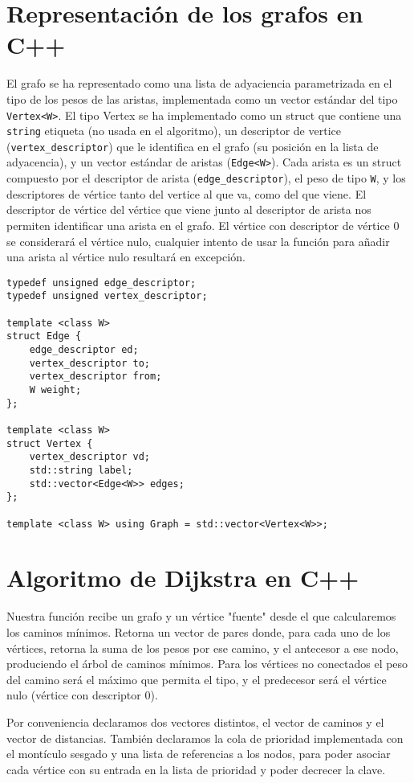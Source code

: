 \documentclass{article}
\begin{document}
\section{Representación de los grafos en C++}
El grafo se ha representado como una lista de adyaciencia parametrizada
en el tipo de los pesos de las aristas, implementada como un vector estándar del 
tipo \texttt{Vertex<W>}. El tipo Vertex se ha implementado como un struct que
contiene una \texttt{string} etiqueta (no usada en el algoritmo), un descriptor de
vertice (\texttt{vertex\_descriptor}) que le identifica en el grafo (su posición en
la lista de adyacencia), y un vector estándar de aristas (\texttt{Edge<W>}). Cada arista es un struct compuesto por el descriptor de arista (\texttt{edge\_descriptor}), el peso de tipo \texttt{W}, y los descriptores de vértice tanto del vertice al que va, como del que viene. El descriptor de vértice del vértice que viene junto al descriptor de arista nos permiten identificar una arista en el grafo. El vértice con descriptor de vértice 0 se considerará el vértice nulo, cualquier intento de usar la función para añadir una arista al vértice nulo resultará en excepción.
\begin{verbatim}
typedef unsigned edge_descriptor;
typedef unsigned vertex_descriptor;

template <class W> 
struct Edge {
    edge_descriptor ed;
    vertex_descriptor to;
    vertex_descriptor from;
    W weight;
};

template <class W>
struct Vertex {
    vertex_descriptor vd;
    std::string label;
    std::vector<Edge<W>> edges;
};

template <class W> using Graph = std::vector<Vertex<W>>;
\end{verbatim}

\section{Algoritmo de Dijkstra en C++}
Nuestra función recibe un grafo y un vértice "fuente" desde el que calcularemos los caminos mínimos. Retorna un vector de pares donde, para cada uno de los vértices, retorna la suma de los pesos por ese camino, y el antecesor a ese nodo, produciendo el árbol de caminos mínimos. Para los vértices no conectados el peso del camino será el máximo que permita el tipo, y el predecesor será el vértice nulo (vértice con descriptor 0).

Por conveniencia declaramos dos vectores distintos, el vector de caminos y el vector de distancias. También declaramos la cola de prioridad implementada con el montículo sesgado y una lista de referencias a los nodos, para poder asociar cada vértice con su entrada en la lista de prioridad y poder decrecer la clave.
\end{document}
